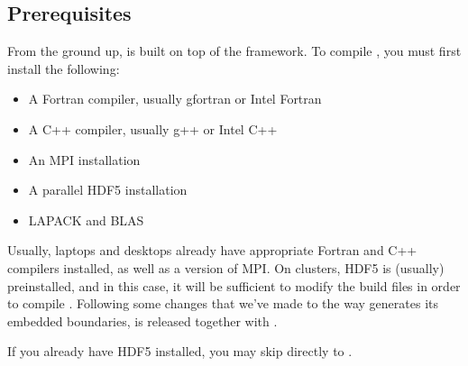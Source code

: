 \documentclass[letterpaper,10pt,english]{sphinxmanual}
\begin{document}
\subsection{Prerequisites}
\label{\detokenize{GettingStarted:prerequisites}}\label{\detokenize{GettingStarted:chap-prerequisites}}
From the ground up,  is built on top of the  framework.
To compile , you must first install the following:
\begin{itemize}
\item {} 
A Fortran compiler, usually gfortran or Intel Fortran

\item {} 
A C++ compiler, usually g++ or Intel C++

\item {} 
An MPI installation

\item {} 
A parallel HDF5 installation

\item {} 
LAPACK and BLAS

\end{itemize}

Usually, laptops and desktops already have appropriate Fortran and C++ compilers installed, as well as a version of MPI.
On clusters, HDF5 is (usually) preinstalled, and in this case, it will be sufficient to modify the  build files in order to compile .
Following some changes that we’ve made to the way  generates its embedded boundaries,  is released together with .

If you already have HDF5 installed, you may skip directly to {\hyperref[\detokenize{GettingStarted:chap-environment}]{}}.
\end{document}
